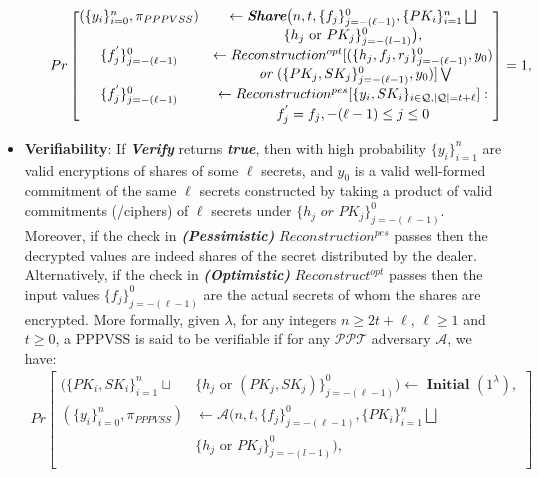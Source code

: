 \begin{itemize}
\begin{itemize}
        \begin{align*}
          Pr\begin{bmatrix}
            (\{y_i\}_{i=0}^n,\pi_{PPPVSS})&\leftarrow \textit{\textbf{Share}} \big(n,t,\{f_j\}_{j=-(\ell-1)}^0,\{PK_i\}_{i=1}^n\bigsqcup\\
            &\{h_j\text{ or }PK_j\}_{j=-(l-1)}^0\big),\\
            \{f_j^{'}\}_{j=-(\ell-1)}^0&\leftarrow Reconstruction^{opt}[(\{h_j,f_j,r_j\}_{j=-(\ell-1)}^0,y_0)\\
            &\textit{ or }(\{PK_j,SK_j\}_{j=-(\ell-1)}^0,y_0)]\bigvee\\
            \{f_j^{'}\}_{j=-(\ell-1)}^0&\leftarrow Reconstruction^{pes}[\{y_i,SK_i\}_{i\in\mathcal{Q},|\mathcal{Q}|=t+\ell}]:\\
            &f_j^{'}=f_j,-(\ell-1)\leq j\leq 0
          \end{bmatrix} = 1,
        \end{align*}
    \end{itemize}
  \item \textbf{Verifiability}: If \textit{\textbf{Verify}} returns \textit{\textbf{true}}, then with high 
    probability $\{y_i\}_{i=1}^n$ are valid encryptions of shares of some $\ell$ secrets, and $y_0$ is a 
    valid well-formed commitment of the same $\ell$ secrets constructed by taking a product of valid commitments (/ciphers) of 
    $\ell$ secrets under $\{h_j\textit{ or }PK_j\}_{j=-(\ell-1)}^0$. Moreover, if the check in \textit{\textbf{(Pessimistic)}} $Reconstruction^{pes}$ 
    passes then the decrypted values are indeed shares of the secret distributed by the dealer. Alternatively, 
    if the check in \textit{\textbf{(Optimistic)}} $Reconstruct^{opt}$ passes then the input values $\{f_j\}_{j=-(\ell-1)}^0$ 
    are the actual secrets of whom the shares are encrypted. More formally, given $\lambda$, for any integers 
    $n\geq 2t+\ell$, $\ell\geq 1$ and $t\geq 0$, a PPPVSS is said to be verifiable if for any $\mathcal{PPT}$ adversary $\mathcal{A}$, 
    we have:
    \begin{align*}
      Pr\begin{bmatrix}
        \big(\{PK_i,SK_i\}_{i=1}^n\sqcup&\{h_j\text{ or }(PK_j,SK_j)\}_{j=-(\ell-1)}^0\big)\leftarrow\textbf{ Initial } (1^\lambda),\\
        (\{y_i\}_{i=0}^n,\pi_{PPPVSS})&\leftarrow \mathcal{A} \big(n,t,\{f_j\}_{j=-(\ell-1)}^0,\{PK_i\}_{i=1}^n\bigsqcup\\
        &\{h_j\text{ or }PK_j\}_{j=-(l-1)}^0\big),\\

\end{bmatrix}
\end{align*}
\end{itemize}
